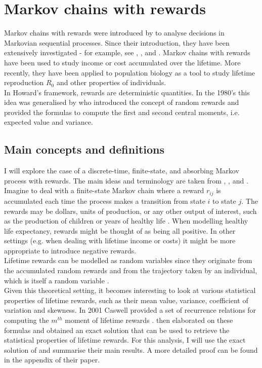\documentclass[\main/main.tex]{subfiles}
\begin{document}
\section{Markov chains with rewards}

Markov chains with rewards were introduced by \cite{Howard1960} to analyse decisions in Markovian sequential processes. Since their introduction, they have been extensively investigated - for example, see \cite{Howard1960}, \cite{Puterman1994}, and \cite{Sheskin2010}. Markov chains with rewards have been used to study income or cost accumulated over the lifetime. More recently, they have been applied to population biology as a tool to study lifetime reproduction $R_0$ \citep{Caswell2011, VanDaalen2015, VanDaalen2017} and other properties of individuals.\\

In Howard's framework, rewards are deterministic quantities. In the 1980's this idea was generalised by \cite{Benito1982} who introduced the concept of random rewards and provided the formulas to compute the first and second central moments, i.e. expected value and variance.


\subsection{Main concepts and definitions}
I will explore the case of a discrete-time, finite-state, and absorbing Markov process with rewards. The main ideas and terminology are taken from \cite{Howard1960}, \cite{Caswell2011}, and \cite{VanDaalen2017}.\\

\noindent Imagine to deal with a finite-state Markov chain where a reward $r_{ij}$ is accumulated each time the process makes a transition from state $i$ to state $j$. The rewards may be dollars, units of production, or any other output of interest, such as the production of children \citep{Caswell2011, VanDaalen2015, VanDaalen2017} or years of healthy life \citep{Caswell2018}.
When modelling healthy life expectancy, rewards might be thought of as being all positive. In other settings (e.g. when dealing with lifetime income or costs) it might be more appropriate to introduce negative rewards.\\

Lifetime rewards can be modelled as random variables since they originate from the accumulated random rewards and from the trajectory taken by an individual, which is itself a random variable  \citep{Caswell2011}.\\
Given this theoretical setting, it becomes interesting to look at various statistical properties of lifetime rewards, such as their mean value, variance, coefficient of variation and skewness. In 2001 Caswell provided a set of recurrence relations for computing the $m^{th}$ moment of lifetime rewards \citep{Caswell2011}. \cite{VanDaalen2017} then elaborated on these formulas and obtained an exact solution that can be used to retrieve the statistical properties of lifetime rewards.  For this analysis, I will use the exact solution of \cite{VanDaalen2017} and summarise their main results. A more detailed proof can be found in the appendix of their paper.
\end{document}
